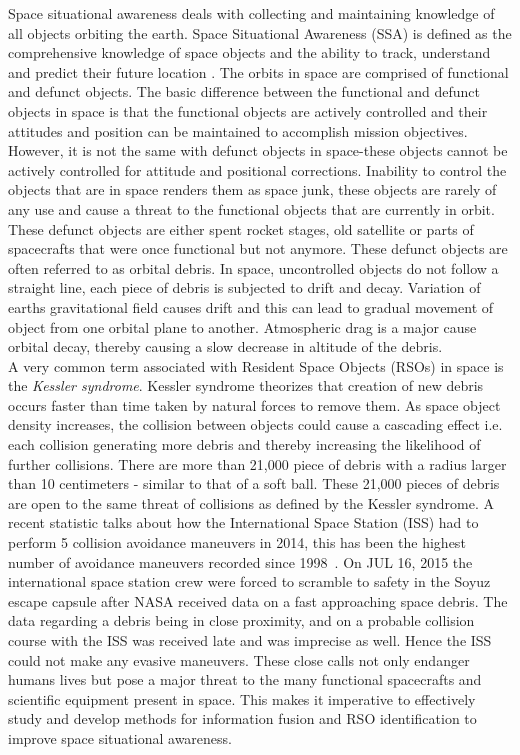 \documentclass[]{aiaa-tc}%
\begin{document}
Space situational awareness deals with collecting and maintaining knowledge of all objects orbiting the earth. Space Situational Awareness (SSA) is defined
as the comprehensive knowledge of space objects and the ability to track, understand and predict their future location \cite{becker_space_2015}. The orbits in space are comprised of functional and defunct objects. The basic difference between the functional and defunct objects in space is that the functional objects are actively controlled and their attitudes and position can be maintained to accomplish mission objectives. However, it is not the same with defunct objects in space-these objects cannot be actively controlled for attitude and positional corrections. Inability to control the objects that are in space renders them as space  junk, these objects are rarely of  any use and cause a threat to the functional objects that are currently in orbit. These defunct objects are either spent rocket stages, old satellite or parts of spacecrafts that were once functional but not anymore.    These defunct objects are often referred to as orbital debris. In space, uncontrolled objects do not follow a straight line, each piece of debris is subjected to drift and decay. Variation of earths gravitational field causes drift and this can lead to gradual movement of object from one orbital plane to another. Atmospheric drag is a major cause orbital decay, thereby causing a slow decrease in altitude of the debris. \\

 A very common term associated with Resident Space Objects (RSOs) in space is the \textit{Kessler syndrome}. Kessler syndrome theorizes that creation of new debris occurs faster than time taken by natural forces to remove them. As space object density  increases, the collision between objects could cause a cascading effect i.e. each collision generating more debris and thereby increasing the likelihood of further collisions. There are more than 21,000 piece of debris with a radius larger than 10 centimeters  - similar to that of a soft ball\cite{nasa_nasa_2015}. These 21,000 pieces of debris are open to the same threat of collisions as defined by the Kessler syndrome. A recent statistic talks about how the International Space Station (ISS) had to perform 5 collision avoidance maneuvers in 2014, this has been the highest number of avoidance maneuvers recorded since 1998~\cite{nasa_orbital_2015}. On JUL 16, 2015 the international space station crew were forced to scramble to safety in the Soyuz escape capsule after NASA received data on a fast approaching space debris\cite{evasive_2015}. The data regarding a debris being in close proximity, and on a probable collision course with the ISS was  received late and was imprecise as well. Hence the ISS could not make any evasive maneuvers. These close calls not only endanger humans lives but pose a major threat to the many functional spacecrafts and scientific equipment present in space. This makes it imperative to effectively study and develop methods for information fusion and RSO identification to improve space situational awareness.\\
 
\end{document}
